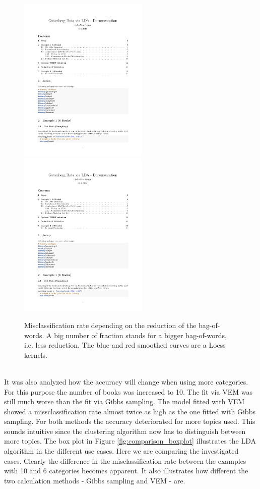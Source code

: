 \documentclass[11pt,a4paper]{article}
\begin{document}
\begin{figure}[h]
	\centering
	\includegraphics[page=14, trim=73 405 60 70,clip,width=0.55\textwidth]{LDA_Documentation.pdf}\includegraphics[page=16, trim=85 275 50 200,clip,width=0.55\textwidth]{LDA_Documentation.pdf}
	\caption{Misclassification rate depending on the reduction of the bag-of-words. A big number of fraction stands for a bigger bag-of-words, i.e. less reduction. The blue and red smoothed curves are a Loess kernels.}
	\label{misc.rate_tfidf}
\end{figure}
\ \\
It was also analyzed how the accuracy will change when using more categories. For this purpose the number of books was increased to 10. The fit via VEM was still much worse than the fit via Gibbs sampling. The model fitted with VEM showed a missclassification rate almost twice as high as the one fitted with Gibbs sampling. For both methods the accuracy deteriorated for more topics used. This sounds intuitive since the clustering algorithm now has to distinguish between more topics. The box plot in Figure \ref{fig:comparison_boxplot} illustrates the LDA algorithm in the different use cases. Here we are comparing the investigated cases. Clearly the difference in the misclassification rate between the examples with 10 and 6 categories becomes apparent. It also illustrates how different the two calculation methods - Gibbs sampling and VEM - are.
\end{document}
